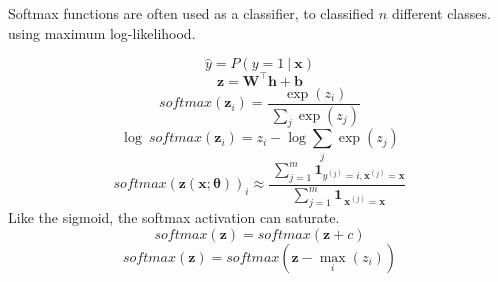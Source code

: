 %
%
%
%
%
%

Softmax functions are often used as a classifier, to classified $n$ different classes.
using maximum log-likelihood.

  \begin{equation} \tag{6.27}
    \label{eq_6_27}
    \hat{y} = P( y=1\ |\ \bm{x} )
  \end{equation}
  \begin{equation} \tag{6.28}
    \label{eq_6_28}
    \bm{z} = \bm{W} ^ \top \bm{h} + \bm{b}
  \end{equation}
  \begin{equation} \tag{6.29}
    \label{eq_6_29}
    softmax( \bm{z} _ i ) = \frac{\ \exp(z_i) } {\ \sum _ j \exp(z_j) }
  \end{equation}
  \begin{equation} \tag{6.30}
    \label{eq_6_30}
    \log\ softmax( \bm{z} _ i ) = z_i - \log \sum _ j \exp(z_j)
  \end{equation}
  \begin{equation} \tag{6.31}
    \label{eq_6_31}
    {softmax( \bm{z}( \bm{x};\bm{\theta} ) )} _ i \approx
      \frac{\ \sum ^ m _ {j=1} \bm{1} _ {y ^ {(j)} = i, \bm{x} ^ {(j)} = \bm{x}} }
        {\ \sum ^ m _ {j=1} \bm{1} _ {\ \bm{x} ^ {(j)} = \bm{x}} }
  \end{equation}
  Like the sigmoid, the softmax activation can saturate.
  \begin{equation} \tag{6.32}
    \label{eq_6_32}
    softmax( \bm{z} ) = softmax( \bm{z} + c )
  \end{equation}
  \begin{equation} \tag{6.33}
    \label{eq_6_33}
    softmax( \bm{z} ) = softmax( \bm{z} - \max _ i (z _ i) )
  \end{equation}
  
